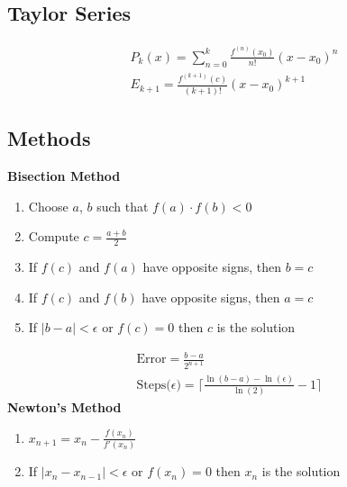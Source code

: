 \documentclass[10pt]{article}
\begin{document}
\begin{multicols}{2}
\begin{minipage}{\columnwidth}
        \subsection*{Taylor Series}
        \begin{align*}
            P_k(x) = \sum_{n=0}^k \frac{f^{(n)}(x_0)}{n!} (x-x_0)^n \\
            E_{k+1} = \frac{f^{(k+1)}(c)}{(k + 1)!}  (x-x_0) ^ {k+1}
        \end{align*}
    \end{minipage}
    \begin{minipage}{\columnwidth}
        \begin{flushright}
            \subsection*{Methods}
            \textbf{Bisection Method}
            \begin{enumerate}
                \item Choose \(a\), \(b\) such that \(f(a) \cdot f(b) < 0\)
                \item Compute \(c = \frac{a+b}{2}\)
                \item If \(f(c)\) and \(f(a)\) have opposite signs, then \(b = c\)
                \item If \(f(c)\) and \(f(b)\) have opposite signs, then \(a = c\)
                \item If \(|b - a| < \epsilon\) or \(f(c) = 0\) then \(c\) is the solution
            \end{enumerate}
            \begin{equation*}
                \begin{aligned}
                    \text{Error} = \frac{b - a}{2^{n + 1}}                                                         & \\
                    \text{Steps(\(\epsilon\))} = \bigl\lceil \frac{\ln(b-a) - \ln(\epsilon)}{\ln(2)}-1 \bigr\rceil &
                \end{aligned}
            \end{equation*}
            \textbf{Newton's Method}
            \begin{enumerate}
                \item \(x_{n+1} = x_n - \frac{f(x_n)}{f'(x_n)}\)
                \item If \(|x_n - x_{n-1}| < \epsilon\) or \(f(x_n) = 0\) then \(x_n\) is the solution
            \end{enumerate}

\end{flushright}
\end{minipage}
\end{multicols}
\end{document}
